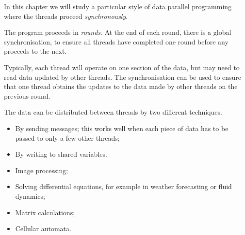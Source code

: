 
\begin{slide}

In this chapter we will study a particular style of data parallel
programming where the threads proceed \emph{synchronously}.  

The program proceeds in \emph{rounds}.  At the end of each round, there is a
global synchronisation, to ensure all threads have completed one round before
any proceeds to the next.
\end{slide}


\begin{slide}

Typically, each thread will operate on one section of the data, but  may
need to read data updated by other threads.  The synchronisation can be used
to ensure that one thread obtains the updates to the data made by other
threads on the previous round.

The data can be distributed between threads by two different techniques.
%
\begin{itemize}
\item
By sending messages; this works well when each piece of data has to be
passed to only a few other threads;

\item
By writing to shared variables.
\end{itemize}

\end{slide}


\begin{slide}

\begin{itemize}
\item
Image processing;

\item
Solving differential equations, for example in weather forecasting or fluid
dynamics; 

\item
Matrix calculations;

\item
Cellular automata.
\end{itemize}
\end{slide}

